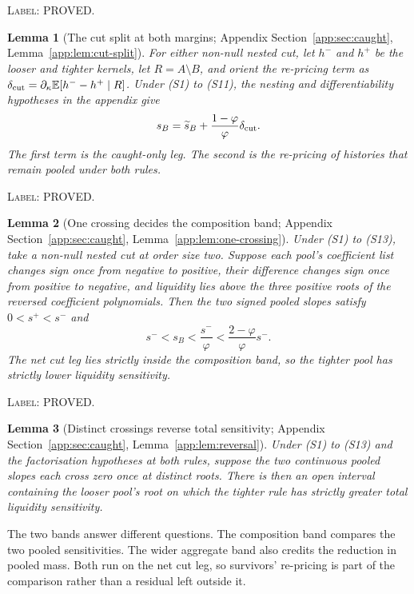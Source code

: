 \documentclass[11pt]{article}
\newtheorem{lemma}{Lemma}
\newcommand{\Eop}{\mathbb{E}}
\begin{document}
\noindent\textsc{Label: PROVED.}\par
\begin{lemma}[The cut split at both margins; Appendix Section~\ref{app:sec:caught}, Lemma~\ref{app:lem:cut-split}]
\label{lem:cut-split}
For either non-null nested cut, let $h^-$ and $h^+$ be the looser and tighter kernels, let
$R=A\setminus B$, and orient the re-pricing term as
$\delta_{\rm cut}=\partial_\kappa\Eop[h^- -h^+\mid R]$. Under (S1) to (S11), the nesting and
differentiability hypotheses in the appendix give
\begin{equation}
\label{eq:cut-split-main}
s_B=\widetilde s_B+\frac{1-\varphi}{\varphi}\delta_{\rm cut}.
\end{equation}
The first term is the caught-only leg. The second is the re-pricing of histories that remain pooled
under both rules.
\end{lemma}

\noindent\textsc{Label: PROVED.}\par
\begin{lemma}[One crossing decides the composition band; Appendix Section~\ref{app:sec:caught}, Lemma~\ref{app:lem:one-crossing}]
\label{lem:one-crossing}
Under (S1) to (S13), take a non-null nested cut at order size two. Suppose each pool's coefficient
list changes sign once from negative to positive, their difference changes sign once from positive
to negative, and liquidity lies above the three positive roots of the reversed coefficient
polynomials. Then the two signed pooled slopes satisfy $0<s^+<s^-$ and
\[
s^-<s_B<\frac{s^-}{\varphi}<\frac{2-\varphi}{\varphi}s^-.
\]
The net cut leg lies strictly inside the composition band, so the tighter pool has strictly lower
liquidity sensitivity.
\end{lemma}

\noindent\textsc{Label: PROVED.}\par
\begin{lemma}[Distinct crossings reverse total sensitivity; Appendix Section~\ref{app:sec:caught}, Lemma~\ref{app:lem:reversal}]
\label{lem:reversal}
Under (S1) to (S13) and the factorisation hypotheses at both rules, suppose the two continuous
pooled slopes each cross zero once at distinct roots. There is then an open interval containing the
looser pool's root on which the tighter rule has strictly greater total liquidity sensitivity.
\end{lemma}

The two bands answer different questions. The composition band compares the two pooled
sensitivities. The wider aggregate band also credits the reduction in pooled mass. Both run on the
net cut leg, so survivors' re-pricing is part of the comparison rather than a residual left outside
it.
\end{document}
